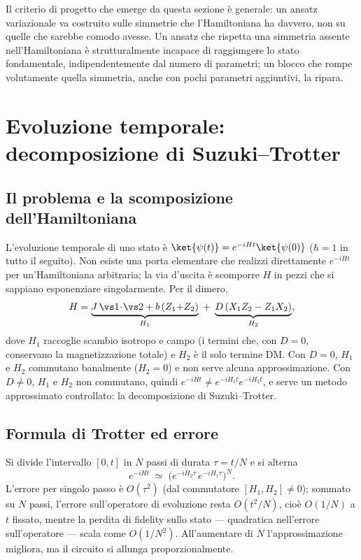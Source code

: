\documentclass[11pt,a4paper]{article}
\begin{document}
Il criterio di progetto che emerge da questa sezione è generale: un
ansatz variazionale va costruito sulle simmetrie che l'Hamiltoniana ha
davvero, non su quelle che sarebbe comodo avesse. Un ansatz che rispetta
una simmetria assente nell'Hamiltoniana è strutturalmente incapace di
raggiungere lo stato fondamentale, indipendentemente dal numero di
parametri; un blocco che rompe volutamente quella simmetria, anche con
pochi parametri aggiuntivi, la ripara.

\section{Evoluzione temporale: decomposizione di Suzuki--Trotter}
\label{sec:trotter}

\subsection{Il problema e la scomposizione dell'Hamiltoniana}

L'evoluzione temporale di uno stato è $\ket{\psi(t)}=e^{-iHt}\ket{\psi(0)}$
($\hbar=1$ in tutto il seguito). Non esiste una porta elementare che
realizzi direttamente $e^{-iHt}$ per un'Hamiltoniana arbitraria; la via
d'uscita è scomporre $H$ in pezzi che si sappiano esponenziare
singolarmente. Per il dimero,
\begin{equation}
H = \underbrace{J\,\vs1\!\cdot\!\vs2 + b\,(Z_1{+}Z_2)}_{H_1}
  \;+\; \underbrace{D\,(X_1Z_2-Z_1X_2)}_{H_2},
\label{eq:H1H2}
\end{equation}
dove $H_1$ raccoglie scambio isotropo e campo (i termini che, con $D=0,$
conservano la magnetizzazione totale) e $H_2$ è il solo termine DM. Con
$D=0$, $H_1$ e $H_2$ commutano banalmente ($H_2=0$) e non serve alcuna
approssimazione. Con $D\neq0$, $H_1$ e $H_2$ non commutano, quindi
$e^{-iHt}\neq e^{-iH_1t}e^{-iH_2t}$, e serve un metodo approssimato
controllato: la decomposizione di Suzuki--Trotter.

\subsection{Formula di Trotter ed errore}

Si divide l'intervallo $[0,t]$ in $N$ passi di durata $\tau=t/N$ e si
alterna
\begin{equation}
e^{-iHt} \;\simeq\; \Big(e^{-iH_2\tau}\,e^{-iH_1\tau}\Big)^{N}.
\label{eq:trotter}
\end{equation}
L'errore per singolo passo è $O(\tau^2)$ (dal commutatore
$[H_1,H_2]\neq0$); sommato su $N$ passi, l'errore sull'operatore di
evoluzione resta $O(t^2/N)$, cioè $O(1/N)$ a $t$ fissato, mentre la
perdita di fidelity sullo stato --- quadratica nell'errore
sull'operatore --- scala come $O(1/N^2)$. All'aumentare di $N$
l'approssimazione migliora, ma il circuito si allunga proporzionalmente.
\end{document}
